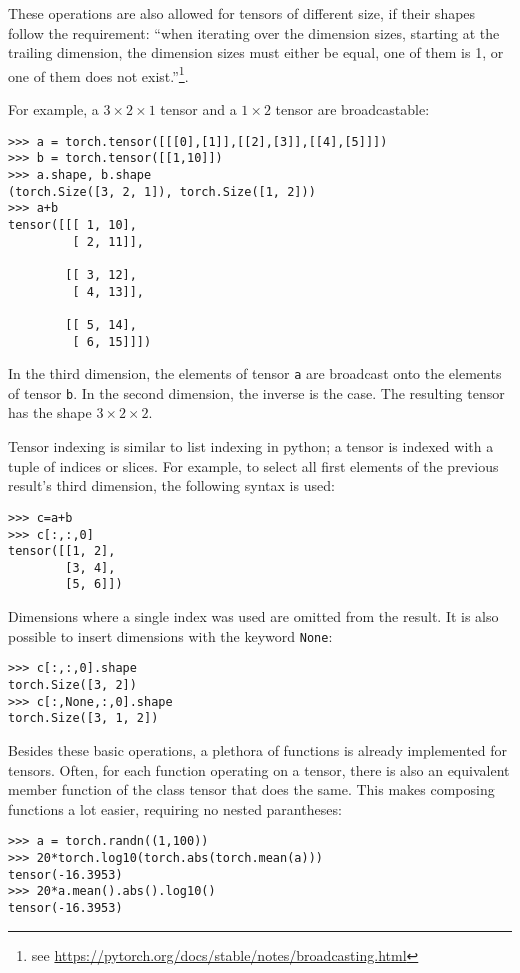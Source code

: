 These operations are also allowed for tensors of different size, if their shapes follow the requirement:
``when iterating over the dimension sizes, starting at the trailing dimension,
the dimension sizes must either be equal, one of them is 1, or one of them does not exist.''\footnote{
    see \url{https://pytorch.org/docs/stable/notes/broadcasting.html}
}.

For example, a $3 \times 2\times 1$ tensor and a $1 \times 2$ tensor are broadcastable:
\begin{lstlisting}
>>> a = torch.tensor([[[0],[1]],[[2],[3]],[[4],[5]]])
>>> b = torch.tensor([[1,10]])
>>> a.shape, b.shape
(torch.Size([3, 2, 1]), torch.Size([1, 2]))
>>> a+b
tensor([[[ 1, 10],
         [ 2, 11]],

        [[ 3, 12],
         [ 4, 13]],

        [[ 5, 14],
         [ 6, 15]]])
\end{lstlisting}
In the third dimension, the elements of tensor \verb|a| are broadcast onto the elements of tensor \verb|b|.
In the second dimension, the inverse is the case. The resulting tensor has the shape $3 \times 2\times 2$.

Tensor indexing is similar to list indexing in python; a tensor is indexed with a tuple of indices or slices.
For example, to select all first elements of the previous result's third dimension, the following syntax is used:
\begin{lstlisting}
>>> c=a+b
>>> c[:,:,0]
tensor([[1, 2],
        [3, 4],
        [5, 6]])
\end{lstlisting}
Dimensions where a single index was used are omitted from the result.
It is also possible to insert dimensions with the keyword \verb|None|:
\begin{lstlisting}
>>> c[:,:,0].shape
torch.Size([3, 2])
>>> c[:,None,:,0].shape
torch.Size([3, 1, 2])
\end{lstlisting}

Besides these basic operations, a plethora of functions is already implemented for tensors.
Often, for each function operating on a tensor,
there is also an equivalent member function of the class tensor that does the same.
This makes composing functions a lot easier, requiring no nested parantheses:
\begin{lstlisting}
>>> a = torch.randn((1,100))
>>> 20*torch.log10(torch.abs(torch.mean(a)))
tensor(-16.3953)
>>> 20*a.mean().abs().log10()
tensor(-16.3953)
\end{lstlisting}

